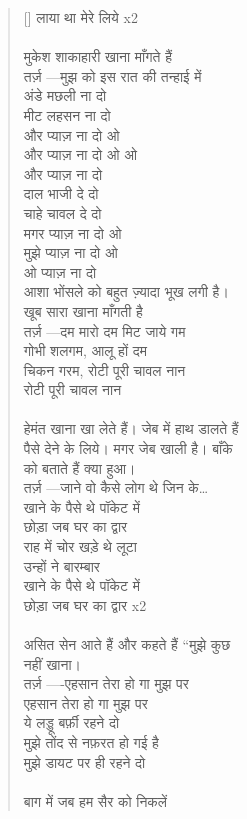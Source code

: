 \begin{verse}[\versewidth]
{लाया था मेरे लिये x2\\
\\
मुकेश शाकाहारी खाना माँगते हैं\\
तर्ज़ —मुझ को इस रात की तन्हाई में\\
अंडे मछली ना दो\\
मीट लहसन ना दो\\
और प्याज़ ना दो ओ\\
और प्याज़ ना दो ओ ओ\\
और प्याज़ ना दो\\
दाल भाजी दे दो\\
चाहे चावल दे दो\\
मगर प्याज़ ना दो ओ\\
मुझे प्याज़ ना दो ओ\\
ओ प्याज़ ना दो\\
आशा भोंसले को बहुत ज़्यादा भूख लगी है।\\
खूब सारा खाना माँगती है\\
तर्ज़ —दम मारो दम मिट जाये गम\\
गोभी शलगम, आलू हों दम\\
चिकन गरम, रोटी पूरी चावल नान\\
रोटी पूरी चावल नान\\
\\
हेमंत खाना खा लेते हैं। जेब में हाथ डालते हैं\\
पैसे देने के लिये। मगर जेब खाली है। बाँके\\
को बताते हैं क्या हुआ।\\
तर्ज़ —जाने वो कैसे लोग थे जिन के…\\
खाने के पैसे थे पॉकेट में\\
छोड़ा जब घर का द्वार\\
राह में चोर खड़े थे लूटा\\
उन्हों ने बारम्बार\\
खाने के पैसे थे पॉकेट में\\
छोड़ा जब घर का द्वार x2\\
\\
असित सेन आते हैं और कहते हैं “मुझे कुछ\\
नहीं खाना।\\
तर्ज़ —-एहसान तेरा हो गा मुझ पर\\
एहसान तेरा हो गा मुझ पर\\
ये लड्डू बर्फ़ी रहने दो\\
मुझे तोंद से नफ़रत हो गई है\\
मुझे डायट पर ही रहने दो\\
\\
बाग में जब हम सैर को निकलें\\
}
\end{verse}
